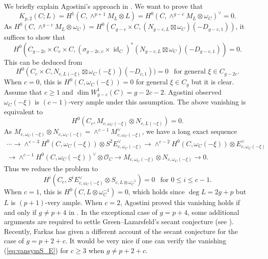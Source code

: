 \documentclass[graybox]{svmult}
\newcommand{\sO}{\mathscr{O}}
\def\id{\operatorname{id}}
\begin{document}
We briefly explain Agostini's approach in \cite{Agostini2}. We want to prove that 
$$
K_{p,2}(C;L)=H^1(C, \wedge^{p+1} M_L \otimes L) = H^0(C, \wedge^{g-c} M_L \otimes \omega_C)^{\vee} = 0.
$$
As $H^0(C, \wedge^{g-c} M_L \otimes \omega_C) = H^0(C_{g-c} \times C, (N_{g-c,L} \boxtimes \omega_C)(-D_{g-c,1}))$, it suffices to show that
$$
H^0(C_{g-2c} \times C_c \times C, (\sigma_{g-2c, c} \times \id_C)^* (N_{g-c,L} \boxtimes \omega_C)(-D_{g-c,1}))=0.
$$
This can be deduced from 
$$
H^0(C_c \times C, N_{c, L(-\xi)} \boxtimes \omega_C(-\xi))(-D_{c,1}))=0~~\text{ for general $\xi \in C_{g-2c}$}.
$$
When $c=0$, this is $H^0(C, \omega_C(-\xi))=0$ for general $\xi \in C_g$ but it is clear. Assume that $c \geq 1$ and $\dim W_{g-c}^1(C) = g-2c-2$. Agostini \cite[Lemma 4.2]{Agostini2} observed $\omega_C(-\xi)$ is $(c-1)$-very ample under this assumption. The above vanishing is equivalent to
$$
H^0(C_c, M_{c, \omega_C(-\xi)} \otimes N_{c, L(-\xi)})=0.
$$
As $M_{c, \omega_C(-\xi)} \otimes N_{c, \omega_C(-\xi)}=\wedge^{c-1} M_{c, \omega_C(-\xi)}^{\vee}$, we have a long exact sequence
$$
\begin{array}{l}
\cdots \longrightarrow \wedge^{c-3} H^0(C, \omega_C(-\xi)) \otimes S^2 E_{c, \omega_C(-\xi)}^{\vee}   \longrightarrow \wedge^{c-2} H^0(C, \omega_C(-\xi)) \otimes E_{c, \omega_C(-\xi)}^{\vee} \\
\longrightarrow  \wedge^{c-1} H^0(C, \omega_C(-\xi))^{\vee} \otimes \sO_C \longrightarrow M_{c, \omega_C(-\xi)} \otimes N_{c, \omega_C(-\xi)} \longrightarrow 0.
\end{array}
$$
Thus we reduce the problem to
\begin{equation}\label{eq:vansymS_E}
H^i(C_c, S^i E_{c, \omega_C(-\xi)}^{\vee} \otimes S_{c, L \otimes \omega_C^{-1}})=0~~\text{ for $0 \leq i \leq c-1$}.
\end{equation}
When $c=1$, this is $H^0(C, L \otimes \omega_C^{-1})=0$, which holds since $\deg L = 2g+p$ but $L$ is $(p+1)$-very ample. When $c=2$, Agostini proved this vanishing holds if and only if $g \neq p+4$ in \cite[Lemma 4.5]{Agostini2}. In the exceptional case of $g=p+4$, some additional arguments are required to settle Green--Lazarsfeld's secant conjecture (see \cite[Section 5]{Agostini2}). Recently, Farkas \cite{Farkas2} has given a different account of the secant conjecture for the case of $g=p+2+c$. It would be very nice if one can verify the vanishing (\ref{eq:vansymS_E}) for $c \geq 3$ when $g \neq p+2+c$.




\end{document}
